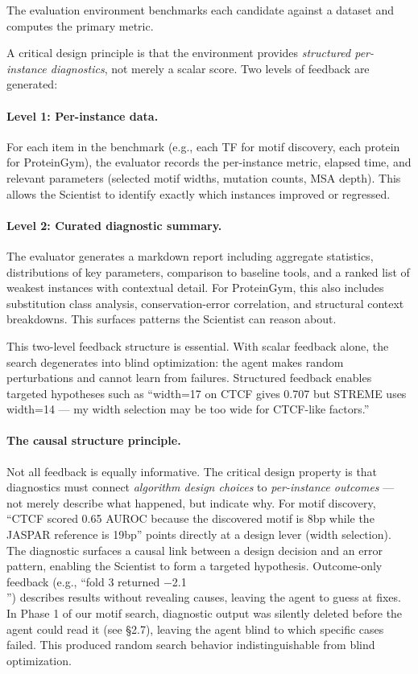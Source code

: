 \documentclass[11pt,a4paper]{article}
\begin{document}
The evaluation environment benchmarks each candidate against a dataset and computes the primary metric.

A critical design principle is that the environment provides \emph{structured per-instance diagnostics}, not merely a scalar score. Two levels of feedback are generated:

\paragraph{Level 1: Per-instance data.} For each item in the benchmark (e.g., each TF for motif discovery, each protein for ProteinGym), the evaluator records the per-instance metric, elapsed time, and relevant parameters (selected motif widths, mutation counts, MSA depth). This allows the Scientist to identify exactly which instances improved or regressed.

\paragraph{Level 2: Curated diagnostic summary.} The evaluator generates a markdown report including aggregate statistics, distributions of key parameters, comparison to baseline tools, and a ranked list of weakest instances with contextual detail. For ProteinGym, this also includes substitution class analysis, conservation-error correlation, and structural context breakdowns. This surfaces patterns the Scientist can reason about.

This two-level feedback structure is essential. With scalar feedback alone, the search degenerates into blind optimization: the agent makes random perturbations and cannot learn from failures. Structured feedback enables targeted hypotheses such as ``width=17 on CTCF gives 0.707 but STREME uses width=14 --- my width selection may be too wide for CTCF-like factors.''

\paragraph{The causal structure principle.}
Not all feedback is equally informative. The critical design property is that diagnostics must connect \emph{algorithm design choices} to \emph{per-instance outcomes} --- not merely describe what happened, but indicate why. For motif discovery, ``CTCF scored 0.65 AUROC because the discovered motif is 8bp while the JASPAR reference is 19bp'' points directly at a design lever (width selection). The diagnostic surfaces a causal link between a design decision and an error pattern, enabling the Scientist to form a targeted hypothesis. Outcome-only feedback (e.g., ``fold 3 returned $-$2.1\\'') describes results without revealing causes, leaving the agent to guess at fixes. In Phase 1 of our motif search, diagnostic output was silently deleted before the agent could read it (see \S2.7), leaving the agent blind to which specific cases failed. This produced random search behavior indistinguishable from blind optimization.
\end{document}
